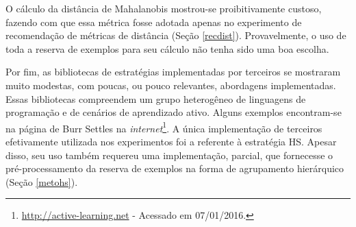 O cálculo da distância de Mahalanobis mostrou-se proibitivamente custoso, fazendo com que essa métrica fosse adotada apenas no experimento de recomendação de métricas de distância (Seção \ref{recdist}).
Provavelmente, o uso de toda a reserva de exemplos para seu cálculo não tenha sido uma boa escolha.

Por fim, as bibliotecas de estratégias implementadas por terceiros se mostraram muito modestas, com poucas, ou pouco relevantes, abordagens implementadas.
Essas bibliotecas compreendem um grupo heterogêneo de linguagens de programação e de cenários de aprendizado ativo.
Alguns exemplos encontram-se na página de Burr Settles na \textit{internet}\footnote{\url{http://active-learning.net} - Acessado em 07/01/2016.}.
A única implementação de terceiros efetivamente utilizada nos experimentos foi a referente à estratégia HS.
Apesar disso, seu uso também requereu uma implementação, parcial, que fornecesse o pré-processamento da reserva de exemplos na forma de agrupamento hierárquico (Seção \ref{metohs}).

